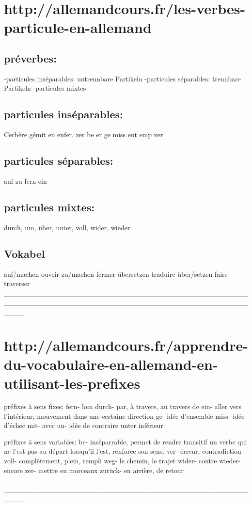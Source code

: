 \section{http://allemandcours.fr/les-verbes-particule-en-allemand}
\subsection{préverbes:}
-particules inséparables:  untrennbare Partikeln
-particules séparables:      trennbare Partikeln
-particules mixtes

\subsection{particules inséparables:}
Cerbère gémit en enfer.
zer be er ge miss ent emp ver

\subsection{particules séparables:}
auf zu fern ein

\subsection{particules mixtes:}
durch, um, über, unter, voll, wider, wieder.

\subsection{Vokabel}
auf/machen            ouvrir
zu/machen             fermer
übersetzen            traduire
über/setzen           faire traverser
____________________________________________________________________________________________________
\section{http://allemandcours.fr/apprendre-du-vocabulaire-en-allemand-en-utilisant-les-prefixes}

préfixes à sens fixes:
fern-                 loin
durch-                par, à travers, au travers de            
ein-                  aller vers l'intérieur, mouvement dans une certaine direction
ge-                   idée d'ensemble
miss-                 idée d'échec
mit-                  avec
un-                   idée de contraire
unter                 inférieur

préfixes à sens variables:
be-                   inséparrable, permet de rendre transitif un verbe qui ne l'est pas au départ
                      lorsqu'il l'est, renforce son sens.
ver-                  érreur, contradiction
voll-                 complêtement, plein, rempli
weg-                  le chemin, le trajet
wider-                contre
wieder-               encore
zer-                  mettre en morceaux
zurück-               en arrière, de retour
____________________________________________________________________________________________________

